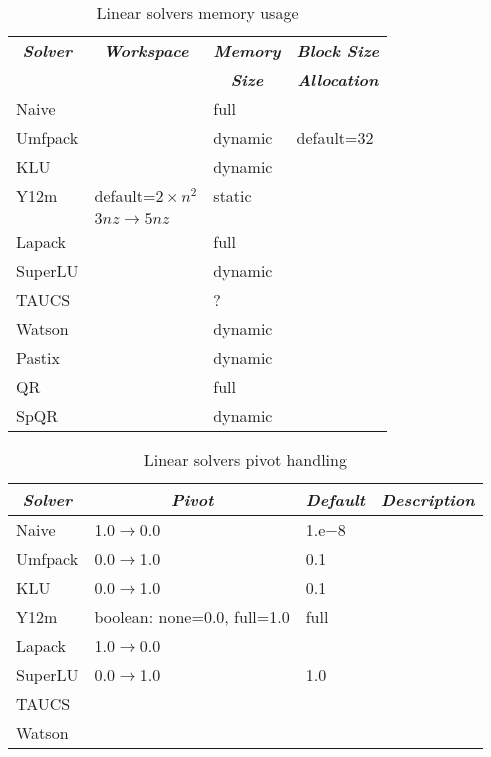 \begin{table}
\centering
\caption{Linear solvers memory usage}\label{tab:linear-solvers-memory}
\begin{tabular}{llll}
\hline
	\multicolumn{1}{c}{\textbf{\emph{Solver}}} &
	\multicolumn{1}{c}{\textbf{\emph{Workspace}}} &
	\multicolumn{1}{c}{\textbf{\emph{Memory}}} &
	\multicolumn{1}{c}{\textbf{\emph{Block Size}}} \\
	&
	&
	\multicolumn{1}{c}{\textbf{\emph{Size}}} &
	\multicolumn{1}{c}{\textbf{\emph{Allocation}}} \\
\hline\hline
	Naive		& 			& full		&		\\
	Umfpack 	& 			& dynamic	& default=32	\\
	KLU 		& 			& dynamic	& 		\\
	Y12m 		& default=$2\times{n^2}$& static	&		\\
			& $3nz \rightarrow 5nz$	&		&		\\
	Lapack		&			& full		&		\\
	SuperLU		& 			& dynamic 	&		\\
	TAUCS		&			& ?		&		\\
	Watson		&			& dynamic	&		\\
	Pastix		&			& dynamic	&		\\
	QR		&			& full		&		\\
	SpQR		&			& dynamic	&		\\
\hline
\end{tabular}
\end{table}

\begin{table}
\centering
\caption{Linear solvers pivot handling}\label{tab:linear-solvers-pivot}
\begin{tabular}{llll}
\hline
	\multicolumn{1}{c}{\textbf{\emph{Solver}}} &
	\multicolumn{1}{c}{\textbf{\emph{Pivot}}} &
	\multicolumn{1}{c}{\textbf{\emph{Default}}} &
	\multicolumn{1}{c}{\textbf{\emph{Description}}} \\
\hline\hline
	Naive		& 1.0$\rightarrow$0.0		& 1.e$-8$	& \\
	Umfpack 	& 0.0$\rightarrow$1.0 		& 0.1 		& \\
	KLU 		& 0.0$\rightarrow$1.0 		& 0.1 		& \\
	Y12m 		& boolean: none=0.0, full=1.0	& full		& \\
	Lapack		& 1.0$\rightarrow$0.0		&		& \\
	SuperLU		& 0.0$\rightarrow$1.0		& 1.0		& \\
	TAUCS		&				&		& \\
	Watson		&				&		& \\
\hline
\end{tabular}
\end{table}



